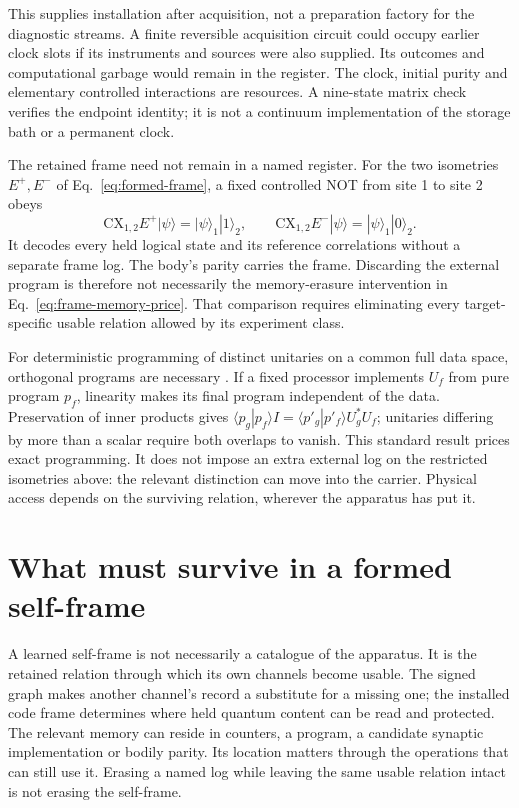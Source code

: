 \documentclass[11pt]{article}
\theoremstyle{definition}
\theoremstyle{remark}
\begin{document}
This supplies installation after acquisition, not a preparation factory
for the diagnostic streams. A finite reversible acquisition circuit
could occupy earlier clock slots if its instruments and sources were
also supplied. Its outcomes and computational garbage would remain in
the register. The clock, initial purity and elementary controlled
interactions are resources. A nine-state matrix check verifies the
endpoint identity; it is not a continuum implementation of the storage
bath or a permanent clock.

The retained frame need not remain in a named register. For the two
isometries $E^+,E^-$ of Eq.~\eqref{eq:formed-frame}, a fixed controlled
NOT from site 1 to site 2 obeys
\[
 \mathrm{CX}_{1,2}E^+|\psi\rangle
   =|\psi\rangle_1|1\rangle_2,\qquad
 \mathrm{CX}_{1,2}E^-|\psi\rangle
   =|\psi\rangle_1|0\rangle_2.
\]
It decodes every held logical state and its reference correlations
without a separate frame log. The body's parity carries the frame.
Discarding the external program is therefore not necessarily the
memory-erasure intervention in Eq.~\eqref{eq:frame-memory-price}.
That comparison requires eliminating every target-specific usable
relation allowed by its experiment class.

For deterministic programming of distinct unitaries on a common full
data space, orthogonal programs are necessary
\cite{NielsenChuang1997}. If a fixed processor implements $U_f$ from
pure program $p_f$, linearity makes its final program independent of
the data. Preservation of inner products gives
$\langle p_g|p_f\rangle I=
\langle p'_g|p'_f\rangle U_g^*U_f$; unitaries differing by more than
a scalar require both overlaps to vanish. This standard result prices
exact programming. It does not impose an extra external log on the
restricted isometries above: the relevant distinction can move into
the carrier. Physical access depends on the surviving relation, wherever
the apparatus has put it.

\section{What must survive in a formed self-frame}
\label{sec:retained-frame}

A learned self-frame is not necessarily a catalogue of the apparatus.
It is the retained relation through which its own channels become usable.
The signed graph makes another channel's record a substitute for a missing
one; the installed code frame determines where held quantum content can be
read and protected. The relevant memory can reside in counters, a program,
a candidate synaptic implementation or bodily parity. Its location matters through the
operations that can still use it. Erasing a named log while leaving the
same usable relation intact is not erasing the self-frame.
\end{document}
